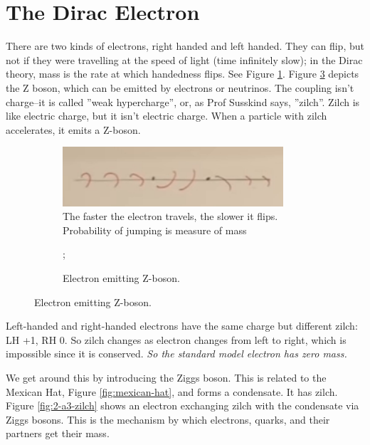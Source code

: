 \documentclass[]{article}
\begin{document}
\section{The Dirac Electron}

There are two kinds of electrons, right handed and left handed. They can flip, but not if they were travelling at the speed of light (time infinitely slow); in the Dirac theory, mass is the rate at which handedness flips. See Figure \ref{fig:2-a3-flipping-electron}. Figure \ref{fig:2-a3-Z-boson} depicts the Z boson, which can be emitted by electrons or neutrinos. The coupling isn't charge--it is called ''weak hypercharge'', or, as Prof Susskind says, ''zilch''. Zilch is like electric charge, but it isn't electric charge. When a particle with zilch accelerates, it emits a Z-boson.

\begin{figure}[H]
	\caption{Electron flipping between left and right}
	\begin{subfigure}[t]{0.65\textwidth}
		\caption{The faster the electron travels, the slower it flips. Probability of jumping is measure of mass}\label{fig:2-a3-flipping-electron}
		\includegraphics[width=0.9\textwidth]{2-a3-flipping-electron}
	\end{subfigure}
	\begin{subfigure}[t]{0.3\textwidth}
		\caption{Electron emitting Z-boson. }\label{fig:2-a3-Z-boson}
		;
	\end{subfigure}	
\end{figure} 


Left-handed and right-handed electrons have the same charge but different zilch: LH +1, RH 0. So zilch changes as electron changes from left to right, which is impossible since it is conserved. \emph{So the standard model electron has zero mass.}

We get around this by introducing the Ziggs boson. This is related to the Mexican Hat, Figure \ref{fig:mexican-hat}, and forms a condensate. It has zilch. Figure \ref{fig:2-a3-zilch} shows an electron exchanging zilch with the condensate via Ziggs bosons. This is the mechanism by which electrons, quarks, and their partners get their mass.
\end{document}
